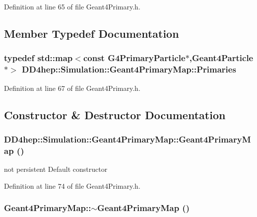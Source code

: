 Definition at line 65 of file Geant4Primary.h.

\subsection{Member Typedef Documentation}
\hypertarget{class_d_d4hep_1_1_simulation_1_1_geant4_primary_map_aec80e9bb254e582ef410dc65da5809c3}{
\subsubsection[{Primaries}]{\setlength{\rightskip}{0pt plus 5cm}typedef std::map$<$const G4PrimaryParticle$\ast$,{\bf Geant4Particle}$\ast$$>$ {\bf DD4hep::Simulation::Geant4PrimaryMap::Primaries}}}
\label{class_d_d4hep_1_1_simulation_1_1_geant4_primary_map_aec80e9bb254e582ef410dc65da5809c3}


Definition at line 67 of file Geant4Primary.h.

\subsection{Constructor \& Destructor Documentation}
\hypertarget{class_d_d4hep_1_1_simulation_1_1_geant4_primary_map_af51091630c9dbeb00db33d3871af05e4}{
\subsubsection[{Geant4PrimaryMap}]{\setlength{\rightskip}{0pt plus 5cm}DD4hep::Simulation::Geant4PrimaryMap::Geant4PrimaryMap ()}}
\label{class_d_d4hep_1_1_simulation_1_1_geant4_primary_map_af51091630c9dbeb00db33d3871af05e4}


not persistent Default constructor 

Definition at line 74 of file Geant4Primary.h.\hypertarget{class_d_d4hep_1_1_simulation_1_1_geant4_primary_map_a7e013501b60e0d0516648405dcf7affd}{
\subsubsection[{$\sim$Geant4PrimaryMap}]{\setlength{\rightskip}{0pt plus 5cm}Geant4PrimaryMap::$\sim$Geant4PrimaryMap ()}}
\label{class_d_d4hep_1_1_simulation_1_1_geant4_primary_map_a7e013501b60e0d0516648405dcf7affd}


